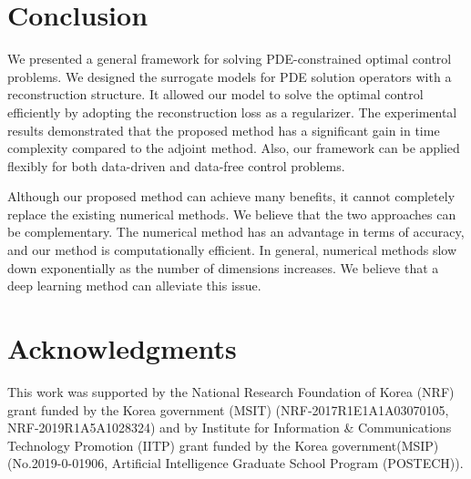 \documentclass[letterpaper]{article}
\begin{document}
\section*{Conclusion}\label{conclusion}
We presented a general framework for solving PDE-constrained optimal control problems. We designed the surrogate models for PDE solution operators with a reconstruction structure. It allowed our model to solve the optimal control efficiently by adopting the reconstruction loss as a regularizer. The experimental results demonstrated that the proposed method has a significant gain in time complexity compared to the adjoint method. Also, our framework can be applied flexibly for both data-driven and data-free control problems.

Although our proposed method can achieve many benefits, it cannot completely replace the existing numerical methods. We believe that the two approaches can be complementary. The numerical method has an advantage in terms of accuracy, and our method is computationally efficient. In general, numerical methods slow down exponentially as the number of dimensions increases. We believe that a deep learning method can alleviate this issue.



\section*{Acknowledgments}

This work was supported by the National Research Foundation of Korea (NRF) grant funded by the Korea government (MSIT) (NRF-2017R1E1A1A03070105, NRF-2019R1A5A1028324) and by Institute for Information \& Communications Technology Promotion (IITP) grant funded by the Korea government(MSIP) (No.2019-0-01906, Artificial Intelligence Graduate School Program (POSTECH)).



\clearpage
\appendix
\end{document}
